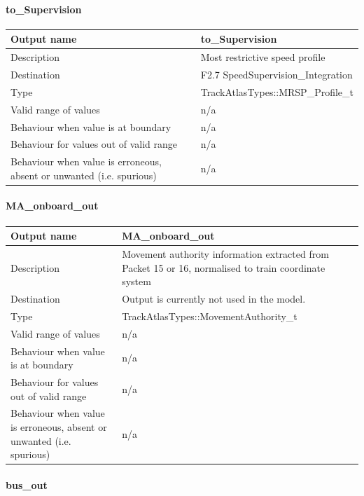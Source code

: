 \paragraph{to\_Supervision}

\begin{longtable}{p{}p{}}
\toprule
Output name				& to\_Supervision \\
\midrule
Description				& Most restrictive speed profile \\
\midrule
Destination				&F2.7 SpeedSupervision\_Integration  \\ 
\midrule
Type					& TrackAtlasTypes::MRSP\_Profile\_t\\
\midrule
Valid range of values	& n/a \\
\midrule
Behaviour when value is at boundary	& n/a  \\
\midrule
Behaviour for values out of valid range	& n/a  \\
\midrule
Behaviour when value is erroneous, absent or unwanted (i.e. spurious) & n/a  \\
\bottomrule
\end{longtable}

\paragraph{MA\_onboard\_out}

\begin{longtable}{p{}p{}}
\toprule
Output name				& MA\_onboard\_out \\
\midrule
Description				& Movement authority information extracted from Packet 15 or 16, normalised to train coordinate system\\
\midrule
Destination				& Output is currently not used in the model.  \\ 
\midrule
Type					& TrackAtlasTypes::MovementAuthority\_t\\
\midrule
Valid range of values	& n/a \\
\midrule
Behaviour when value is at boundary	& n/a  \\
\midrule
Behaviour for values out of valid range	& n/a  \\
\midrule
Behaviour when value is erroneous, absent or unwanted (i.e. spurious) & n/a  \\
\bottomrule
\end{longtable}

\paragraph{bus\_out}

